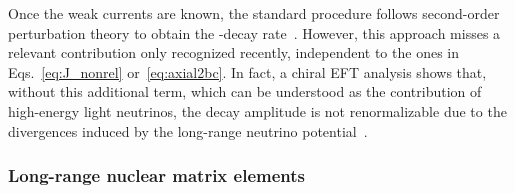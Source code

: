 


Once the weak currents are known, the standard procedure follows second-order perturbation theory to obtain the \bbonu-decay rate~\cite{Doi:1985dx}. However, this approach misses a relevant contribution only recognized recently, independent to the ones in Eqs.~\eqref{eq:J_nonrel} or~\eqref{eq:axial2bc}. In fact, a chiral EFT analysis shows that, without this additional term, which can be understood as the contribution of high-energy light neutrinos, the decay amplitude is not renormalizable due to the divergences induced by the long-range neutrino potential~\cite{Cirigliano:2018hja}.

\subsubsection{Long-range nuclear matrix elements}

